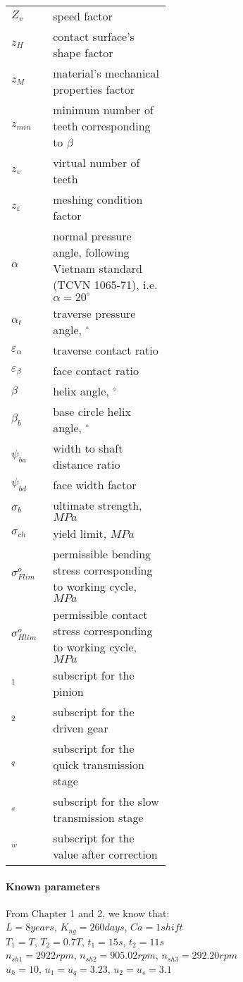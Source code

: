\begin{tabular}[t]{p{0.05\linewidth}p{0.4\linewidth}}
	$ Z_v $ & speed factor\\
	$ z_H $ & contact surface's shape factor\\
	$ z_M $ & material's mechanical properties factor \\
	$ z_{min} $ & minimum number of teeth corresponding to $ \beta $\\
	$ z_v $ & virtual number of teeth\\
	$ z_\varepsilon $ & meshing condition factor\\
	$ \alpha $ & normal pressure angle, following Vietnam standard (TCVN 1065-71), i.e. $ \alpha = 20^\circ $\\
	$ \alpha_t $ & traverse pressure angle, $ ^\circ $\\
	$ \varepsilon_\alpha $ & traverse contact ratio\\
	$ \varepsilon_\beta $ & face contact ratio\\
	$ \beta $ & helix angle, $ ^\circ $\\
	$ \beta_b $ & base circle helix angle, $ ^\circ $\\
	$ \psi_{ba} $ & width to shaft distance ratio\\
	$ \psi_{bd} $ & face width factor \\
	$ \sigma_b $ & ultimate strength, $ \unit{MPa} $\\
	$ \sigma_{ch} $ & yield limit, $ \unit{MPa} $\\
	$ \sigma_{Flim}^o $ & permissible bending stress corresponding to working cycle, $ \unit{MPa} $\\
	$ \sigma_{Hlim}^o $ & permissible contact stress corresponding to working cycle, $ \unit{MPa} $\\
	$ _{1} $ & subscript for the pinion \\
	$ _{2} $ & subscript for the driven gear\\
	$ _q $ & subscript for the quick transmission stage\\
	$ _s $ & subscript for the slow transmission stage\\
	$ _w $ & subscript for the value after correction\\
\end{tabular}

\paragraph{Known parameters} From Chapter 1 and 2, we know that:\\
$ L=8\unit{years} $, $ K_{ng}=260\unit{days} $, $ Ca=1\unit{shift} $\\
$ T_1=T$, $T_2=0.7T$, $ t_1=15\unit{s}$, $t_2=11\unit{s} $\\
$ n_{sh1}=2922\unit{rpm} $, $ n_{sh2}=905.02\unit{rpm} $, $ n_{sh3}=292.20\unit{rpm} $\\
$ u_h=10 $, $ u_1 =u_q=3.23$, $ u_2=u_s=3.1 $

